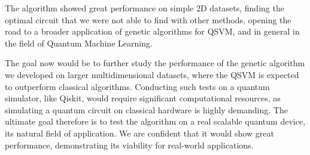 \documentclass[12pt]{article}
\begin{document}
The algorithm showed great performance on simple 2D datasets, finding the optimal circuit that we were not able to find with other methods, opening the road to a broader application of genetic algorithms for QSVM, and in general in the field of Quantum Machine Learning. 

The goal now would be to further study the performance of the genetic algorithm we developed on larger multidimensional datasets, where the QSVM is expected to outperform classical algorithms. Conducting such tests on a quantum simulator, like Qiskit, would require significant computational resources, as simulating a quantum circuit on classical hardware is highly demanding. The ultimate goal therefore is to test the algorithm on a real scalable quantum device, its natural field of application. We are confident that it would show great performance, demonstrating its viability for real-world applications.


\newpage
\end{document}

